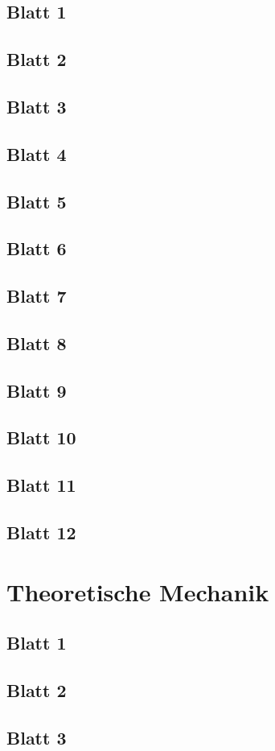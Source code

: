 \documentclass{tuftebook}
\numberwithin{Theorem}{chapter}
\theoremstyle{definition}
\theoremstyle{definition}
\begin{document}
\section{Blatt 1}

\section{Blatt 2}

\section{Blatt 3}

\section{Blatt 4}

\section{Blatt 5}

\section{Blatt 6}

\section{Blatt 7}

\section{Blatt 8}

\section{Blatt 9}

\section{Blatt 10}

\section{Blatt 11}

\section{Blatt 12}


\chapter{Theoretische Mechanik}
\section{Blatt 1}

\section{Blatt 2}

\section{Blatt 3}

\end{document}
